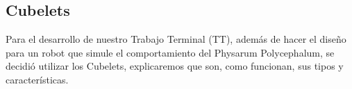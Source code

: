 \subsection{Cubelets}
\label{subsection:cubelets}

    Para el desarrollo de nuestro Trabajo Terminal (TT), adem\'as de hacer el dise\~no para
        un robot que simule el comportamiento del Physarum Polycephalum, se decidi\'o
        utilizar los Cubelets, explicaremos que son, como funcionan, sus tipos y
        caracter\'isticas.
    \vskip 0.5cm
    
    
    